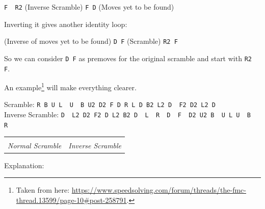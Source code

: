 \documentclass[11pt,a4paper]{book}
\newcommand{\p}{\textquotesingle}
\newcommand{\m}{\texttt}
\newcommand{\ps}{\p\,\,}
\begin{document}
\begin{center}
\m{F\ps R2} (Inverse Scramble) \m{F D\p} (Moves yet to be found)
\end{center}

Inverting it gives another identity loop:

\begin{center}
(Inverse of moves yet to be found) \m{D F\p} (Scramble) \m{R2 F}
\end{center}

So we can consider \m{D F\p} as premoves for the original scramble and start with \m{R2 F}.

An example\footnote{Taken from here: \url{https://www.speedsolving.com/forum/threads/the-fmc-thread.13599/page-10\#post-258791}.} will make everything clearer.

\begin{center}
Scramble: \m{R B U L\ps U\ps B U2 D2 F D R L D B2 L2 D\ps F2 D2 L2 D}\\
Inverse Scramble: \m{D\ps L2 D2 F2 D L2 B2 D\ps L\ps R\ps D\ps F\ps D2 U2 B\ps U L U\ps B\ps R\ps}\\
\begin{tabular}{cc}
 & \\
\emph{Normal Scramble} & \emph{Inverse Scramble} 
\end{tabular}
\end{center}

Explanation:
\end{document}
